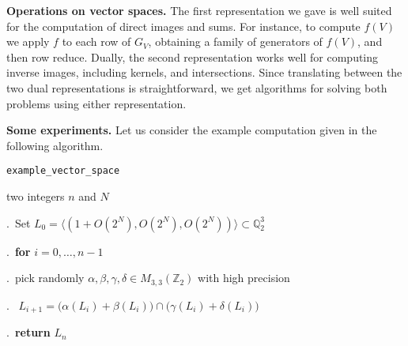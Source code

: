 \documentclass{sig-alternate-2013}
\newcommand{\Z}{\mathbb Z}
\newcommand{\Q}{\mathbb Q}
\begin{document}
\medskip

\noindent
{\bf Operations on vector spaces.}
The first representation we gave is well suited for the computation
of direct images and sums. For instance, to compute $f(V)$
we apply $f$ to each row of $G_V$, obtaining a
family of generators of $f(V)$, and then row reduce. Dually, the
second representation works well for computing inverse images, including 
kernels, and intersections. Since translating between the two dual
representations is straightforward, we get algorithms for solving both
problems using either representation.


\smallskip

\noindent
{\bf Some experiments.}
Let us consider the example computation given in the following
algorithm.

\noindent\hrulefill

 {\tt example\_vector\_space}

 two integers $n$ and $N$

\smallskip

.\ Set $L_0 = \langle (1 + O(2^N),  O(2^N), O(2^N)) \rangle
\subset \Q_2^3$

.\ {\bf for} $i=0,\dots,n-1$

.\ \hspace{0.3cm}pick randomly $\alpha, \beta, \gamma, \delta
\in M_{3,3}(\Z_2)$ with high precision

.\ \hspace{0.3cm}{\bf compute} $L_{i+1} = 
\big(\alpha(L_i) + \beta(L_i)\big) \cap \big(\gamma(L_i) + \delta(L_i)\big)$

.\ {\bf return} $L_n$

\vspace{-1ex}\noindent\hrulefill

\medskip
\end{document}
